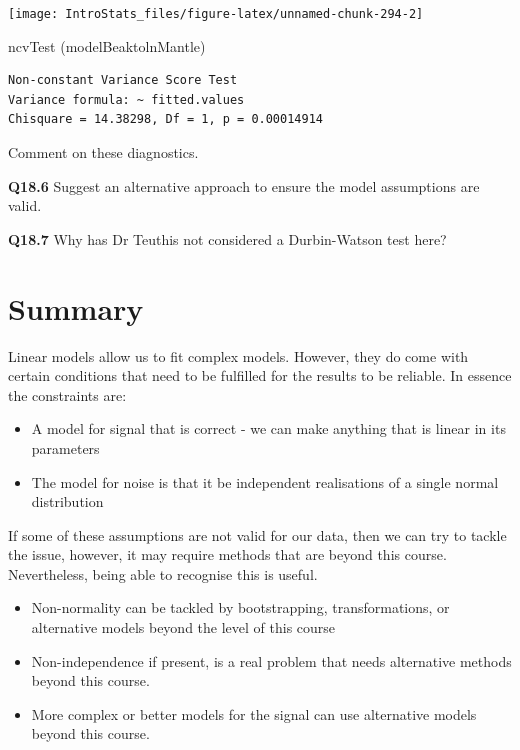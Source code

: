 \documentclass[
  oneside]{krantz}
\newenvironment{Shaded}{\begin{snugshade}}{\end{snugshade}}
\newcommand{\FunctionTok}[1]{\textcolor[rgb]{0.00,0.00,0.00}{#1}}
\newcommand{\NormalTok}[1]{#1}
\providecommand{\tightlist}{%
  \setlength{\itemsep}{0pt}\setlength{\parskip}{0pt}}
\begin{document}
\begin{center}\texttt{[image: IntroStats\_files/figure-latex/unnamed-chunk-294-2]} \end{center}

\begin{Shaded}
\begin{Highlighting}[]
\FunctionTok{ncvTest}\NormalTok{ (modelBeaktolnMantle)}
\end{Highlighting}
\end{Shaded}

\begin{verbatim}
Non-constant Variance Score Test 
Variance formula: ~ fitted.values 
Chisquare = 14.38298, Df = 1, p = 0.00014914
\end{verbatim}

Comment on these diagnostics.

\textbf{Q18.6} Suggest an alternative approach to ensure the model assumptions are valid.

\textbf{Q18.7} Why has Dr Teuthis not considered a Durbin-Watson test here?

\hypertarget{SUMdiag}{%
\section{Summary}\label{SUMdiag}}

Linear models allow us to fit complex models. However, they do come with certain conditions that need to be fulfilled for the results to be reliable. In essence the constraints are:

\begin{itemize}
\tightlist
\item
  A model for signal that is correct - we can make anything that is linear in its parameters
\item
  The model for noise is that it be independent realisations of a single normal distribution
\end{itemize}

If some of these assumptions are not valid for our data, then we can try to tackle the issue, however, it may require methods that are beyond this course. Nevertheless, being able to recognise this is useful.

\begin{itemize}
\item
  Non-normality can be tackled by bootstrapping, transformations, or alternative models beyond the level of this course
\item
  Non-independence if present, is a real problem that needs alternative methods beyond this course.
\item
  More complex or better models for the signal can use alternative models beyond this course.
\end{itemize}
\end{document}

